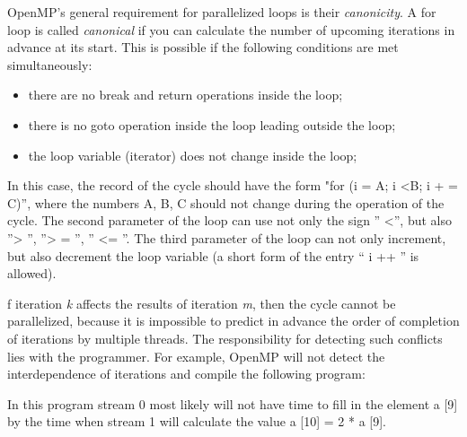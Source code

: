 {OpenMP's general requirement for parallelized loops is their \textit {canonicity}. A for loop is called \textit {canonical} if you can calculate the number of upcoming iterations in advance at its start. This is possible if the following conditions are met simultaneously:
	\begin{itemize}
		\item there are no break and return operations inside the loop;
		\item there is no goto operation inside the loop leading outside the loop;
		\item the loop variable (iterator) does not change inside the loop;
	\end{itemize}
In this case, the record of the cycle should have the form "for (i = A; i <B; i + = C)'', where the numbers A, B, C should not change during the operation of the cycle. The second parameter of the loop can use not only the sign '' <'', but also ''> '', ''> = '', '' <= ''. The third parameter of the loop can not only increment, but also decrement the loop variable (a short form of the entry `` i ++ '' is allowed).
	\par f iteration \textit{k} affects the results of iteration \textit{m}, then the cycle cannot be parallelized, because it is impossible to predict in advance the order of completion of iterations by multiple threads. The responsibility for detecting such conflicts lies with the programmer. For example, OpenMP will not detect the interdependence of iterations and compile the following program:
	\begin{figure}[H]
		
	\end{figure}
	\par In this program stream 0 most likely will not have time to fill in the element a [9] by the time when stream 1 will calculate the value a [10] = 2 * a [9].
	\par
}